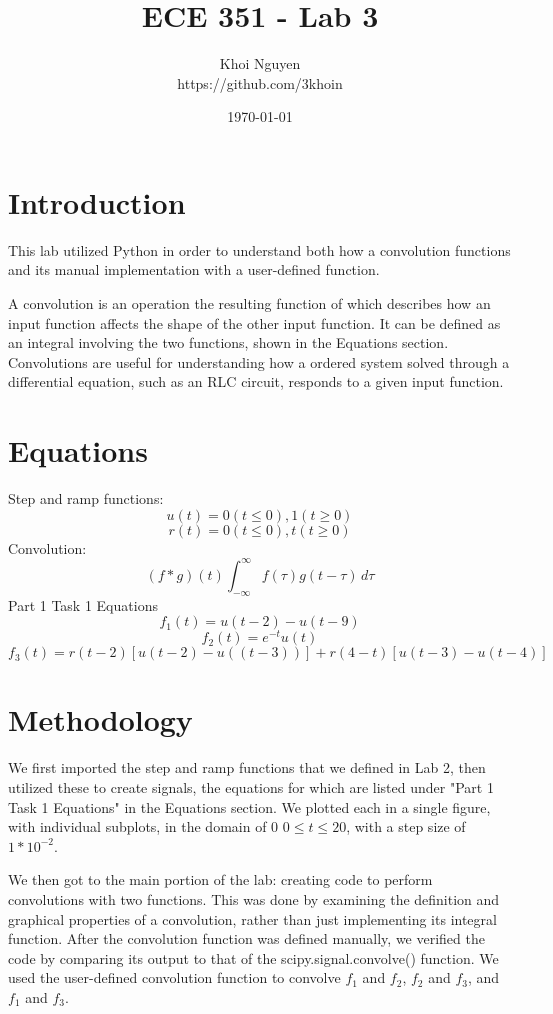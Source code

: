 \documentclass[11pt,a4]{article}
\title{ECE 351 - Lab 3}
\author{Khoi Nguyen \\ https://github.com/3khoin}
\date{\today}
\begin{document}
\maketitle
\pagebreak
	
\tableofcontents
\pagebreak

\section{Introduction}
This lab utilized Python in order to understand both how a convolution functions and its manual implementation with a user-defined function.

A convolution is an operation the resulting function of which describes how an input function affects the shape of the other input function. It can be defined as an integral involving the two functions, shown in the Equations section. Convolutions are useful for understanding how a ordered system solved through a differential equation, such as an RLC circuit, responds to a given input function.

\section{Equations}
Step and ramp functions:
\[u(t) = {0(t \leq 0)}, 1(t \geq 0)\]
\[r(t) = {0(t \leq 0)}, t(t \geq 0)\]
Convolution:
\[(f*g)(t) \int_{-\infty}^{\infty} f(\tau)g(t-\tau) \,d\tau \]
Part 1 Task 1 Equations
\[f_{1}(t) = u(t-2) - u(t-9)\]
\[f_{2}(t) = e^{-t}u(t)\]
\[f_{3}(t) = r(t-2)[u(t-2)-u((t-3))]+r(4-t)[u(t-3)-u(t-4)]\]

\section{Methodology}
We first imported the step and ramp functions that we defined in Lab 2, then utilized these to create signals, the equations for which are listed under "Part 1 Task 1 Equations" in the Equations section. We plotted each in a single figure, with individual subplots, in the domain of 0 $0 \leq t \leq 20$, with a step size of $1*10^{-2}$.

We then got to the main portion of the lab: creating code to perform convolutions with two functions. This was done by examining the definition and graphical properties of a convolution, rather than just implementing its integral function. After the convolution function was defined manually, we verified the code by comparing its output to that of the scipy.signal.convolve() function. We used the user-defined convolution function to convolve $f_1$ and $f_2$, $f_2$ and $f_3$, and $f_1$ and $f_3$.
\end{document}
